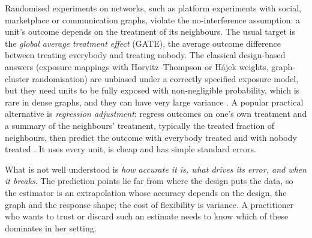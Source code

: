 Randomised experiments on networks, such as platform experiments with social, marketplace or communication graphs, violate the no-interference assumption: a unit's outcome depends on the treatment of its neighbours. The usual target is the \emph{global average treatment effect} (GATE), the average outcome difference between treating everybody and treating nobody. The classical design-based answers (exposure mappings with Horvitz--Thompson or H\'ajek weights, graph-cluster randomisation) are unbiased under a correctly specified exposure model, but they need units to be fully exposed with non-negligible probability, which is rare in dense graphs, and they can have very large variance \citep{aronow2017estimating,ugander2013graph,eckles2017design}. A popular practical alternative is \emph{regression adjustment}: regress outcomes on one's own treatment and a summary of the neighbours' treatment, typically the treated fraction of neighbours, then predict the outcome with everybody treated and with nobody treated \citep{chin2019regression,han2023model}. It uses every unit, is cheap and has simple standard errors.

What is not well understood is \emph{how accurate it is, what drives its error, and when it breaks}. The prediction points lie far from where the design puts the data, so the estimator is an extrapolation whose accuracy depends on the design, the graph and the response shape; the cost of flexibility is variance. A practitioner who wants to trust or discard such an estimate needs to know which of these dominates in her setting.

